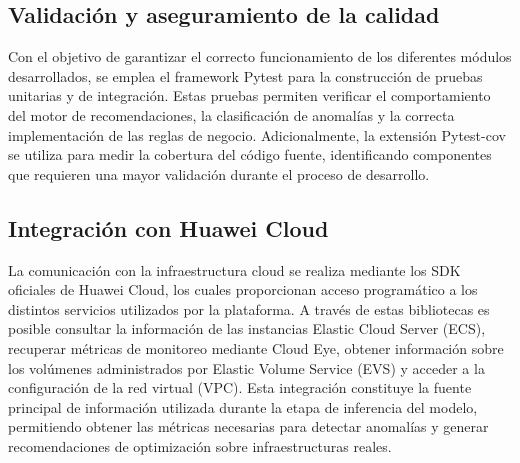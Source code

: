 \subsection{Validación y aseguramiento de la calidad}

Con el objetivo de garantizar el correcto funcionamiento de los
diferentes módulos desarrollados, se emplea el framework Pytest para la
construcción de pruebas unitarias y de integración. Estas pruebas
permiten verificar el comportamiento del motor de recomendaciones, la
clasificación de anomalías y la correcta implementación de las reglas de
negocio. Adicionalmente, la extensión Pytest-cov se utiliza para medir
la cobertura del código fuente, identificando componentes que requieren
una mayor validación durante el proceso de desarrollo.

\subsection{Integración con Huawei Cloud}

La comunicación con la infraestructura cloud se realiza mediante los SDK
oficiales de Huawei Cloud, los cuales proporcionan acceso programático a
los distintos servicios utilizados por la plataforma. A través de estas
bibliotecas es posible consultar la información de las instancias
Elastic Cloud Server (ECS), recuperar métricas de monitoreo mediante
Cloud Eye, obtener información sobre los volúmenes administrados por
Elastic Volume Service (EVS) y acceder a la configuración de la red
virtual (VPC). Esta integración constituye la fuente principal de
información utilizada durante la etapa de inferencia del modelo,
permitiendo obtener las métricas necesarias para detectar anomalías y
generar recomendaciones de optimización sobre infraestructuras reales.

